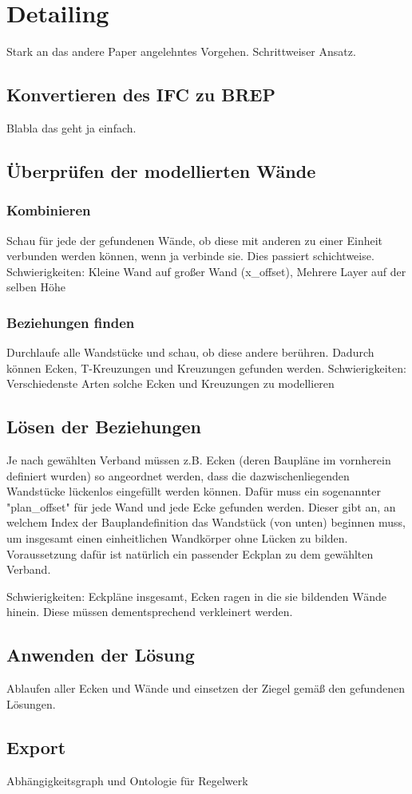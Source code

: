 \section{Detailing}
Stark an das andere Paper angelehntes Vorgehen.
Schrittweiser Ansatz.

\subsection{Konvertieren des IFC zu BREP}
Blabla das geht ja einfach.

\subsection{Überprüfen der modellierten Wände}
\subsubsection{Kombinieren}
Schau für jede der gefundenen Wände, ob diese mit anderen zu einer Einheit verbunden werden können, wenn ja verbinde sie.
Dies passiert schichtweise.
Schwierigkeiten: Kleine Wand auf großer Wand (x\_offset), Mehrere Layer auf der selben Höhe
\subsubsection{Beziehungen finden}
Durchlaufe alle Wandstücke und schau, ob diese andere berühren.
Dadurch können Ecken, T-Kreuzungen und Kreuzungen gefunden werden.
Schwierigkeiten: Verschiedenste Arten solche Ecken und Kreuzungen zu modellieren 

\subsection{Lösen der Beziehungen}
Je nach gewählten Verband müssen z.B. Ecken (deren Baupläne im vornherein definiert wurden) so angeordnet werden, dass die dazwischenliegenden Wandstücke lückenlos eingefüllt werden können.
Dafür muss ein sogenannter "plan\_offset" für jede Wand und jede Ecke gefunden werden. Dieser gibt an, an welchem Index der Bauplandefinition das Wandstück (von unten) beginnen muss, um insgesamt einen einheitlichen Wandkörper ohne Lücken zu bilden.
Voraussetzung dafür ist natürlich ein passender Eckplan zu dem gewählten Verband. 

Schwierigkeiten: Eckpläne insgesamt, Ecken ragen in die sie bildenden Wände hinein. Diese müssen dementsprechend verkleinert werden.

\subsection{Anwenden der Lösung}
Ablaufen aller Ecken und Wände und einsetzen der Ziegel gemäß den gefundenen Lösungen.

\subsection{Export}
Abhängigkeitsgraph und Ontologie für Regelwerk